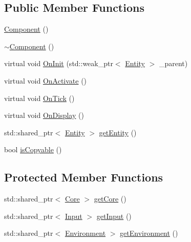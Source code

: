 \subsection*{Public Member Functions}
\begin{DoxyCompactItemize}
\item 
\hyperlink{classfrontier_1_1_component_a21f8f2b1292143a1e74d985024e34589}{Component} ()
\item 
\hyperlink{classfrontier_1_1_component_a919c8260a4e6c1a14165bf9d1b903423}{$\sim$\+Component} ()
\item 
virtual void \hyperlink{classfrontier_1_1_component_af3da02905c4d79219d9b12f260a35ad1}{On\+Init} (std\+::weak\+\_\+ptr$<$ \hyperlink{classfrontier_1_1_entity}{Entity} $>$ \+\_\+parent)
\item 
virtual void \hyperlink{classfrontier_1_1_component_a77fca7ba1960aafb9bc05905e300c79d}{On\+Activate} ()
\item 
virtual void \hyperlink{classfrontier_1_1_component_ab920f9bc07ce051ebb5559c5a66508d1}{On\+Tick} ()
\item 
virtual void \hyperlink{classfrontier_1_1_component_a8faf337be5ba5fa3ca65c4be79d904c4}{On\+Display} ()
\item 
std\+::shared\+\_\+ptr$<$ \hyperlink{classfrontier_1_1_entity}{Entity} $>$ \hyperlink{classfrontier_1_1_component_aad8262fcb8cd477f226d39c4df93f6d8}{get\+Entity} ()
\item 
bool \hyperlink{classfrontier_1_1_component_a1a32971a12ec277a519b30ba056c9d89}{is\+Copyable} ()
\end{DoxyCompactItemize}
\subsection*{Protected Member Functions}
\begin{DoxyCompactItemize}
\item 
std\+::shared\+\_\+ptr$<$ \hyperlink{classfrontier_1_1_core}{Core} $>$ \hyperlink{classfrontier_1_1_component_a22c7d6b053ca38af4ba1e2a9e16c9a57}{get\+Core} ()
\item 
std\+::shared\+\_\+ptr$<$ \hyperlink{classfrontier_1_1_input}{Input} $>$ \hyperlink{classfrontier_1_1_component_a02d631ca43dd6d403cbd51ee8654d15a}{get\+Input} ()
\item 
std\+::shared\+\_\+ptr$<$ \hyperlink{classfrontier_1_1_environment}{Environment} $>$ \hyperlink{classfrontier_1_1_component_acb3039046e8c62976723d6715a1905b6}{get\+Environment} ()
\end{DoxyCompactItemize}
